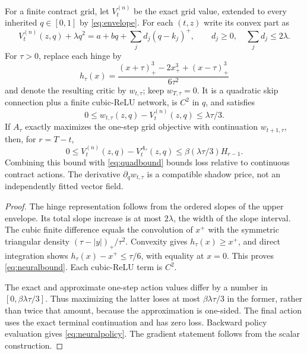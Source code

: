 \begin{corollary}\label{cor:neural}
For a finite contract grid, let $V_t^{(n)}$ be the exact grid value, extended to every inherited $q\in[0,1]$ by \eqref{eq:envelope}. For each $(t,z)$ write its convex part as
\[
 V_t^{(n)}(z,q)+\lambda q^2=a+bq+\sum_j d_j(q-k_j)^+,
 \qquad d_j\geq0,\quad \sum_jd_j\leq2\lambda.
\]
For $\tau>0$, replace each hinge by
\[
 h_\tau(x)=\frac{(x+\tau)_+^3-2x_+^3+(x-\tau)_+^3}{6\tau^2}
\]
and denote the resulting critic by $w_{t,\tau}$; keep $w_{T,\tau}=0$. It is a quadratic skip connection plus a finite cubic-ReLU network, is $C^2$ in $q$, and satisfies
\begin{equation}\label{eq:neuralbound}
 0\leq w_{t,\tau}(z,q)-V_t^{(n)}(z,q)\leq\lambda\tau/3.
\end{equation}
If $A_\tau$ exactly maximizes the one-step grid objective with continuation $w_{t+1,\tau}$, then, for $r=T-t$,
\begin{equation}\label{eq:neuralpolicy}
 0\leq V_t^{(n)}(z,q)-V_t^{A_\tau}(z,q)
 \leq\beta(\lambda\tau/3)H_{r-1}.
\end{equation}
Combining this bound with \eqref{eq:quadbound} bounds loss relative to continuous contract actions. The derivative $\partial_qw_{t,\tau}$ is a compatible shadow price, not an independently fitted vector field.
\end{corollary}
\begin{proof}
The hinge representation follows from the ordered slopes of the upper envelope. Its total slope increase is at most $2\lambda$, the width of the slope interval. The cubic finite difference equals the convolution of $x^+$ with the symmetric triangular density $(\tau-|y|)_+/\tau^2$. Convexity gives $h_\tau(x)\geq x^+$, and direct integration shows $h_\tau(x)-x^+\leq\tau/6$, with equality at $x=0$. This proves \eqref{eq:neuralbound}. Each cubic-ReLU term is $C^2$.

The exact and approximate one-step action values differ by a number in $[0,\beta\lambda\tau/3]$. Thus maximizing the latter loses at most $\beta\lambda\tau/3$ in the former, rather than twice that amount, because the approximation is one-sided. The final action uses the exact terminal continuation and has zero loss. Backward policy evaluation gives \eqref{eq:neuralpolicy}. The gradient statement follows from the scalar construction.\end{proof}

